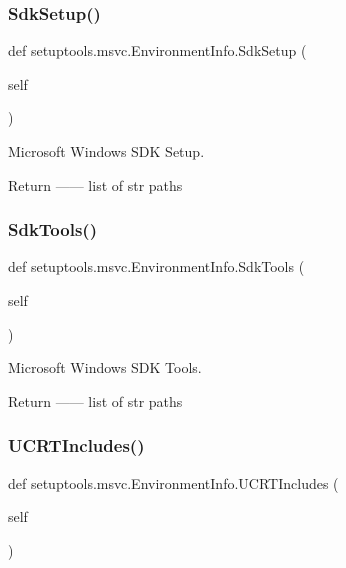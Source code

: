\subsubsection{\texorpdfstring{Sdk\+Setup()}{SdkSetup()}}
{\footnotesize\ttfamily def setuptools.\+msvc.\+Environment\+Info.\+Sdk\+Setup (\begin{DoxyParamCaption}\item[{}]{self }\end{DoxyParamCaption})}

\begin{DoxyVerb}Microsoft Windows SDK Setup.

Return
------
list of str
    paths
\end{DoxyVerb}
 \mbox{\label{classsetuptools_1_1msvc_1_1EnvironmentInfo_acb23a9749e0fe111972811bf363d4d06}} 
\subsubsection{\texorpdfstring{Sdk\+Tools()}{SdkTools()}}
{\footnotesize\ttfamily def setuptools.\+msvc.\+Environment\+Info.\+Sdk\+Tools (\begin{DoxyParamCaption}\item[{}]{self }\end{DoxyParamCaption})}

\begin{DoxyVerb}Microsoft Windows SDK Tools.

Return
------
list of str
    paths
\end{DoxyVerb}
 \mbox{\label{classsetuptools_1_1msvc_1_1EnvironmentInfo_ae8cddbeb1c6a6d60edc6e46104ef30d0}} 
\subsubsection{\texorpdfstring{U\+C\+R\+T\+Includes()}{UCRTIncludes()}}
{\footnotesize\ttfamily def setuptools.\+msvc.\+Environment\+Info.\+U\+C\+R\+T\+Includes (\begin{DoxyParamCaption}\item[{}]{self }\end{DoxyParamCaption})}


